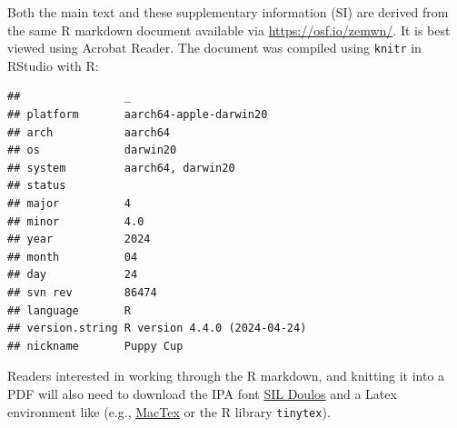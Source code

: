\documentclass[preprint]{JASA}
\begin{document}
Both the main text and these supplementary information (SI) are derived from the same R markdown document available via \href{OSF}{https://osf.io/zemwn/}. It is best viewed using Acrobat Reader. The document was compiled using \texttt{knitr} in RStudio with R:

\begin{verbatim}
##                _                           
## platform       aarch64-apple-darwin20      
## arch           aarch64                     
## os             darwin20                    
## system         aarch64, darwin20           
## status                                     
## major          4                           
## minor          4.0                         
## year           2024                        
## month          04                          
## day            24                          
## svn rev        86474                       
## language       R                           
## version.string R version 4.4.0 (2024-04-24)
## nickname       Puppy Cup
\end{verbatim}

Readers interested in working through the R markdown, and knitting it into a PDF will also need to download the IPA font \href{https://software.sil.org/doulos/download/}{SIL Doulos} and a Latex environment like (e.g., \href{https://tug.org/mactex/mactex-download.html}{MacTex} or the R library \texttt{tinytex}).
\end{document}
